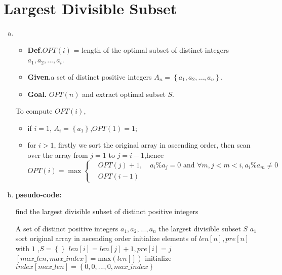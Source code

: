\section{Largest Divisible Subset}
\begin{enumerate}[a).]
\item
\begin{itemize}
	\item \textbf{Def.}\qquad$OPT(i)$ = length of the optimal subset  of distinct integers $a_1,a_2,...,a_i$.
	\item \textbf{Given.}\quad a set of distinct positive integers $A_n = \left \lbrace a_1,a_2,...,a_n\right \rbrace$.
	\item \textbf{Goal.} \quad$OPT(n)$ and extract optimal subset $S$.
\end{itemize} 
To compute $OPT(i)$,
\begin{itemize}
	\item if $i = 1$, $A_i = \left\lbrace a_1\right \rbrace $,$OPT(1) = 1$;
	\item for $i > 1$, firstly we sort the original array in ascending order,
		then scan over the array from $j = 1$ to $j = i-1$,hence
		\begin{equation*}
		  OPT(i) = \max \left\lbrace \begin{split} 
		  &OPT(j) + 1,\quad a_i\%a_{j} = 0 \text{ and }\forall m, j<m<i, a_i\%a_{m} \neq 0	\\
		  &OPT(i-1) 
		  \label{form1}
		  \end{split} \right . 
		\end{equation*}
\end{itemize}
\item \textbf{pseudo-code:}
\begin{algorithm}[H]
	\caption{find the largest divisible subset of distinct positive integers}
	\begin{algorithmic}[1]
		\Require A set of distinct positive integers $a_1,a_2,...,a_n$
		\Ensure the largest divisible subset $S$ 
		  \Return $a_1$
		\EndIf
		\State sort original array in ascending order
	    \State initialize elements of $len[n] ,pre[n]$ with $1$ ,$S=\left\lbrace \right\rbrace $
				 \State $len[i] = len[j] + 1, pre[i] = j$
			 	\EndIf 
			\EndFor  
		\EndFor 
		\State $[{max\_len},{max\_index}] = \text{max}(len[])$
		\State initialize $index[max\_len] = \left\lbrace 0,0,...,0,max\_index\right\rbrace $

\end{algorithmic}
\end{algorithm}
\end{enumerate}

